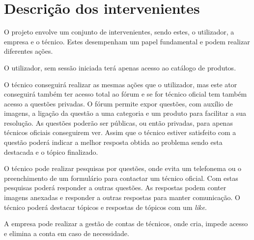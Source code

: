\section{Descrição dos intervenientes}
O projeto envolve um conjunto de intervenientes, sendo estes, o utilizador, a empresa e o técnico. Estes desempenham um papel fundamental e podem realizar diferentes ações.

O utilizador, sem sessão iniciada terá apenas acesso ao catálogo de produtos.

O técnico conseguirá realizar as mesmas ações que o utilizador, mas este ator conseguirá também ter acesso total ao fórum e se for técnico oficial tem também acesso a questões privadas. O fórum permite expor questões, com auxílio de imagens, a ligação da questão a uma categoria e um produto para facilitar a sua resolução. As questões poderão ser públicas, ou então privadas, para apenas técnicos oficiais conseguirem ver. Assim que o técnico estiver satisfeito com a questão poderá indicar a melhor resposta obtida ao problema sendo esta destacada e o tópico finalizado.

O técnico pode realizar pesquisas por questões, onde evita um telefonema ou o preenchimento de um formulário para contactar um técnico oficial. Com estas pesquisas poderá responder a outras questões. As respostas podem conter imagens anexadas e responder a outras respostas para manter comunicação. O técnico poderá destacar tópicos e respostas de tópicos com um \textit{like}.

A empresa pode realizar a gestão de contas de técnicos, onde cria, impede acesso e elimina a conta em caso de necessidade.
